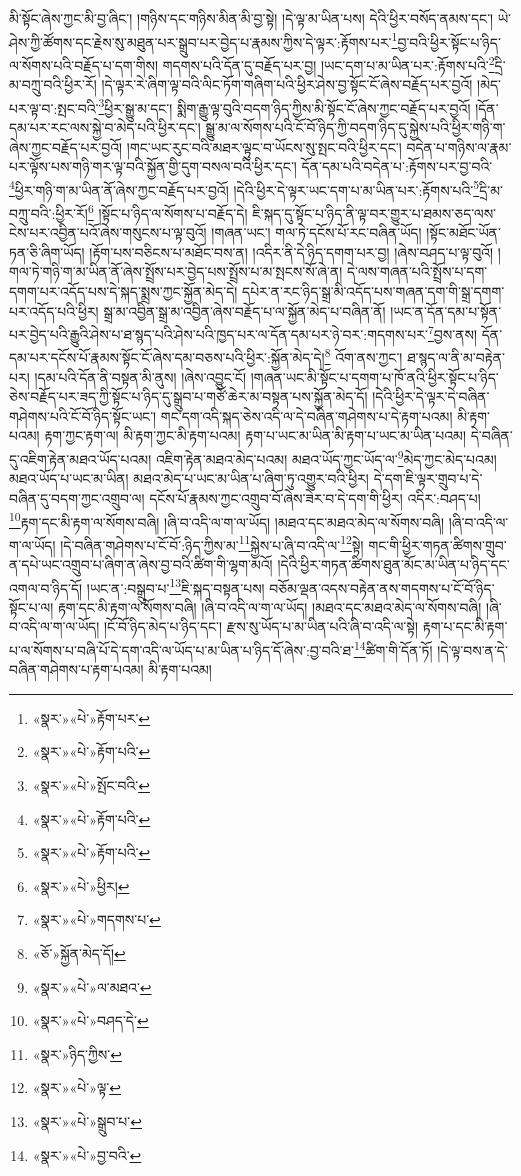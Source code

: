 མི་སྟོང་ཞེས་ཀྱང་མི་བྱ་ཞིང་། །གཉིས་དང་གཉིས་མིན་མི་བྱ་སྟེ། །དེ་ལྟ་མ་ཡིན་པས། དེའི་ཕྱིར་བསོད་ནམས་དང་། ཡེ་ཤེས་ཀྱི་ཚོགས་དང་རྗེས་སུ་མཐུན་པར་སྒྲུབ་པར་བྱེད་པ་རྣམས་ཀྱིས་དེ་ལྟར་:རྟོགས་པར་\footnote{«སྣར་»«པེ་»རྟོག་པར་}བྱ་བའི་ཕྱིར་སྟོང་པ་ཉིད་ལ་སོགས་པའི་བརྗོད་པ་དག་གིས། གདགས་པའི་དོན་དུ་བརྗོད་པར་བྱ། །ཡང་དག་པ་མ་ཡིན་པར་:རྟོགས་པའི་\footnote{«སྣར་»«པེ་»རྟོག་པའི་}དྲི་མ་བཀྲུ་བའི་ཕྱིར་རོ། །དེ་ལྟར་རེ་ཞིག་ལྟ་བའི་ལིང་ཏོག་གཞིག་པའི་ཕྱིར་ཤེས་བྱ་སྟོང་ངོ་ཞེས་བརྗོད་པར་བྱའོ། །མེད་པར་ལྟ་བ་:སྤང་བའི་\footnote{«སྣར་»«པེ་»སྤོང་བའི་}ཕྱིར་སྒྱུ་མ་དང་། སྨིག་རྒྱུ་ལྟ་བུའི་བདག་ཉིད་ཀྱིས་མི་སྟོང་ངོ་ཞེས་ཀྱང་བརྗོད་པར་བྱའོ། །དོན་དམ་པར་རང་ལས་སྐྱེ་བ་མེད་པའི་ཕྱིར་དང་། སྒྱུ་མ་ལ་སོགས་པའི་ངོ་བོ་ཉིད་ཀྱི་བདག་ཉིད་དུ་སྐྱེས་པའི་ཕྱིར་གཉི་ག་ཞེས་ཀྱང་བརྗོད་པར་བྱའོ། །གང་ཡང་རུང་བའི་མཐར་ལྟུང་བ་ཡོངས་སུ་སྤང་བའི་ཕྱིར་དང་། བདེན་པ་གཉིས་ལ་རྣམ་པར་ལྟོས་པས་གཉི་གར་ལྟ་བའི་སྐྱོན་གྱི་དུག་བསལ་བའི་ཕྱིར་དང་། དོན་དམ་པའི་བདེན་པ་:རྟོགས་པར་བྱ་བའི་\footnote{«སྣར་»«པེ་»རྟོག་པའི་}ཕྱིར་གཉི་ག་མ་ཡིན་ནོ་ཞེས་ཀྱང་བརྗོད་པར་བྱའོ། །དེའི་ཕྱིར་དེ་ལྟར་ཡང་དག་པ་མ་ཡིན་པར་:རྟོགས་པའི་\footnote{«སྣར་»«པེ་»རྟོག་པའི་}དྲི་མ་བཀྲུ་བའི་:ཕྱིར་རོ།\footnote{«སྣར་»«པེ་»ཕྱིར།} །སྟོང་པ་ཉིད་ལ་སོགས་པ་བརྗོད་དེ། ཇི་སྐད་དུ་སྟོང་པ་ཉིད་ནི་ལྟ་བར་གྱུར་པ་ཐམས་ཅད་ལས་ངེས་པར་འབྱིན་པའོ་ཞེས་གསུངས་པ་ལྟ་བུའོ། །གཞན་ཡང་། གལ་ཏེ་དངོས་པོ་རང་བཞིན་ཡོད། །སྟོང་མཐོང་ཡོན་ཏན་ཅི་ཞིག་ཡོད། །རྟོག་པས་བཅིངས་པ་མཐོང་བས་ན། །འདིར་ནི་དེ་ཉིད་དགག་པར་བྱ། །ཞེས་བཤད་པ་ལྟ་བུའོ། །གལ་ཏེ་གཉི་ག་མ་ཡིན་ནོ་ཞེས་སྤྲོས་པར་བྱེད་པས་སྤྲོས་པ་མ་སྤངས་སོ་ཞེ་ན། དེ་ལས་གཞན་པའི་སྤྲོས་པ་དག་དགག་པར་འདོད་པས་དེ་སྐད་སྨྲས་ཀྱང་སྐྱོན་མེད་དེ། དཔེར་ན་རང་ཉིད་སྒྲ་མི་འདོད་པས་གཞན་དག་གི་སྒྲ་དགག་པར་འདོད་པའི་ཕྱིར། སྒྲ་མ་འབྱིན་སྒྲ་མ་འབྱིན་ཞེས་བརྗོད་པ་ལ་སྐྱོན་མེད་པ་བཞིན་ནོ། །ཡང་ན་དོན་དམ་པ་སྟོན་པར་བྱེད་པའི་རྒྱུའི་ཤེས་པ་ཐ་སྙད་པའི་ཤེས་པའི་ཁྱད་པར་ལ་དོན་དམ་པར་ཉེ་བར་:གདགས་པར་\footnote{«སྣར་»«པེ་»གདགས་པ་}བྱས་ནས། དོན་དམ་པར་དངོས་པོ་རྣམས་སྟོང་ངོ་ཞེས་དམ་བཅས་པའི་ཕྱིར་:སྐྱོན་མེད་དེ།\footnote{«ཅོ་»སྐྱོན་མེད་དོ།} འོག་ནས་ཀྱང་། ཐ་སྙད་ལ་ནི་མ་བརྟེན་པར། །དམ་པའི་དོན་ནི་བསྟན་མི་ནུས། །ཞེས་འབྱུང་ངོ། །གཞན་ཡང་མི་སྟོང་པ་དགག་པ་ཁོ་ནའི་ཕྱིར་སྟོང་པ་ཉིད་ཅེས་བརྗོད་པར་ཟད་ཀྱི་སྟོང་པ་ཉིད་དུ་སྒྲུབ་པ་གཙོ་ཆེར་མ་བསྟན་པས་སྐྱོན་མེད་དོ། །དེའི་ཕྱིར་དེ་ལྟར་དེ་བཞིན་གཤེགས་པའི་ངོ་བོ་ཉིད་སྟོང་ཡང་། གང་དག་འདི་སྐད་ཅེས་འདི་ལ་དེ་བཞིན་གཤེགས་པ་དེ་རྟག་པའམ། མི་རྟག་པའམ། རྟག་ཀྱང་རྟག་ལ། མི་རྟག་ཀྱང་མི་རྟག་པའམ། རྟག་པ་ཡང་མ་ཡིན་མི་རྟག་པ་ཡང་མ་ཡིན་པའམ། དེ་བཞིན་དུ་འཇིག་རྟེན་མཐའ་ཡོད་པའམ། འཇིག་རྟེན་མཐའ་མེད་པའམ། མཐའ་ཡོད་ཀྱང་ཡོད་ལ་\footnote{«སྣར་»«པེ་»ལ་མཐའ་}མེད་ཀྱང་མེད་པའམ། མཐའ་ཡོད་པ་ཡང་མ་ཡིན། མཐའ་མེད་པ་ཡང་མ་ཡིན་པ་ཞིག་ཏུ་འགྱུར་བའི་ཕྱིར། དེ་དག་ཇི་ལྟར་གྲུབ་པ་དེ་བཞིན་དུ་བདག་ཀྱང་འགྲུབ་ལ། དངོས་པོ་རྣམས་ཀྱང་འགྲུབ་བོ་ཞེས་ཟེར་བ་དེ་དག་གི་ཕྱིར། འདིར་:བཤད་པ། \footnote{«སྣར་»«པེ་»བཤད་དེ་}རྟག་དང་མི་རྟག་ལ་སོགས་བཞི། །ཞི་བ་འདི་ལ་ག་ལ་ཡོད། །མཐའ་དང་མཐའ་མེད་ལ་སོགས་བཞི། །ཞི་བ་འདི་ལ་ག་ལ་ཡོད། །དེ་བཞིན་གཤེགས་པ་ངོ་བོ་:ཉིད་ཀྱིས་མ་\footnote{«སྣར་»ཉིད་ཀྱིས་}སྐྱེས་པ་ཞི་བ་འདི་ལ་\footnote{«སྣར་»«པེ་»ལྟ་}སྟེ། གང་གི་ཕྱིར་གཏན་ཚིགས་གྲུབ་ན་དཔེ་ཡང་འགྲུབ་པ་ཞིག་ན་ཞེས་བྱ་བའི་ཚིག་གི་ལྷག་མའོ། །དེའི་ཕྱིར་གཏན་ཚིགས་ཐུན་མོང་མ་ཡིན་པ་ཉིད་དང་འགལ་བ་ཉིད་དོ། །ཡང་ན་:བསྒྲུབ་པ་\footnote{«སྣར་»«པེ་»སྒྲུབ་པ་}ཇི་སྐད་བསྟན་པས། བཅོམ་ལྡན་འདས་བརྟེན་ནས་གདགས་པ་ངོ་བོ་ཉིད་སྟོང་པ་ལ། རྟག་དང་མི་རྟག་ལ་སོགས་བཞི། །ཞི་བ་འདི་ལ་ག་ལ་ཡོད། །མཐའ་དང་མཐའ་མེད་ལ་སོགས་བཞི། །ཞི་བ་འདི་ལ་ག་ལ་ཡོད། །ངོ་བོ་ཉིད་མེད་པ་ཉིད་དང་། རྫས་སུ་ཡོད་པ་མ་ཡིན་པའི་ཞི་བ་འདི་ལ་སྟེ། རྟག་པ་དང་མི་རྟག་པ་ལ་སོགས་པ་བཞི་པོ་དེ་དག་འདི་ལ་ཡོད་པ་མ་ཡིན་པ་ཉིད་དོ་ཞེས་:བྱ་བའི་ཐ་\footnote{«སྣར་»«པེ་»བྱ་བའི་}ཚིག་གི་དོན་ཏོ། །དེ་ལྟ་བས་ན་དེ་བཞིན་གཤེགས་པ་རྟག་པའམ། མི་རྟག་པའམ། 